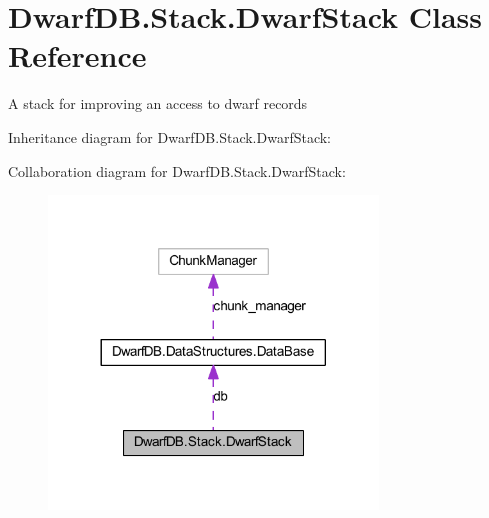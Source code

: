 \hypertarget{class_dwarf_d_b_1_1_stack_1_1_dwarf_stack}{\section{Dwarf\+D\+B.\+Stack.\+Dwarf\+Stack Class Reference}
\label{class_dwarf_d_b_1_1_stack_1_1_dwarf_stack}
}


A stack for improving an access to dwarf records  




Inheritance diagram for Dwarf\+D\+B.\+Stack.\+Dwarf\+Stack\+:


Collaboration diagram for Dwarf\+D\+B.\+Stack.\+Dwarf\+Stack\+:
\nopagebreak
\begin{figure}[H]
\begin{center}
\leavevmode
\includegraphics[width=248pt]{class_dwarf_d_b_1_1_stack_1_1_dwarf_stack__coll__graph}
\end{center}
\end{figure}
